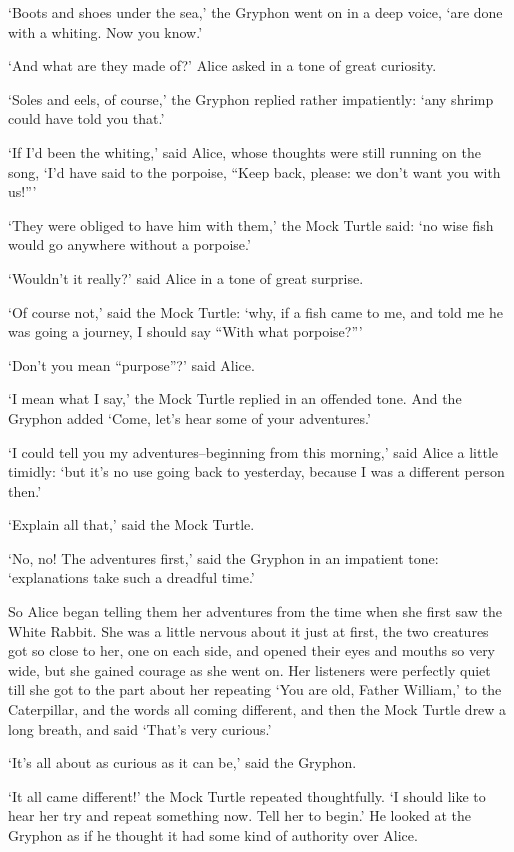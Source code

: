\documentclass[statementpaper,twoside,openany]{memoir}
\begin{document}
`Boots and shoes under the sea,' the Gryphon went on in a deep voice, `are done with a whiting. Now you know.'

`And what are they made of?' Alice asked in a tone of great curiosity.

`Soles and eels, of course,' the Gryphon replied rather impatiently: `any shrimp could have told you that.'

`If I'd been the whiting,' said Alice, whose thoughts were still running on the song, `I'd have said to the porpoise, ``Keep back, please: we don't want you with us!'''

`They were obliged to have him with them,' the Mock Turtle said: `no wise fish would go anywhere without a porpoise.'

`Wouldn't it really?' said Alice in a tone of great surprise.

`Of course not,' said the Mock Turtle: `why, if a fish came to me, and told me he was going a journey, I should say ``With what porpoise?'''

`Don't you mean ``purpose''?' said Alice.

`I mean what I say,' the Mock Turtle replied in an offended tone. And the Gryphon added `Come, let's hear some of your adventures.'

`I could tell you my adventures--beginning from this morning,' said Alice a little timidly: `but it's no use going back to yesterday, because I was a different person then.'

`Explain all that,' said the Mock Turtle.

`No, no! The adventures first,' said the Gryphon in an impatient tone: `explanations take such a dreadful time.'

So Alice began telling them her adventures from the time when she first saw the White Rabbit. She was a little nervous about it just at first, the two creatures got so close to her, one on each side, and opened their eyes and mouths so very wide, but she gained courage as she went on. Her listeners were perfectly quiet till she got to the part about her repeating `You are old, Father William,' to the Caterpillar, and the words all coming different, and then the Mock Turtle drew a long breath, and said `That's very curious.'

`It's all about as curious as it can be,' said the Gryphon.

`It all came different!' the Mock Turtle repeated thoughtfully. `I should like to hear her try and repeat something now. Tell her to begin.' He looked at the Gryphon as if he thought it had some kind of authority over Alice.
\end{document}
